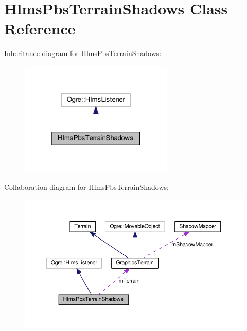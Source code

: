 \hypertarget{class_hlms_pbs_terrain_shadows}{}\section{Hlms\+Pbs\+Terrain\+Shadows Class Reference}
\label{class_hlms_pbs_terrain_shadows}


Inheritance diagram for Hlms\+Pbs\+Terrain\+Shadows\+:\nopagebreak
\begin{figure}[H]
\begin{center}
\leavevmode
\includegraphics[width=208pt]{class_hlms_pbs_terrain_shadows__inherit__graph}
\end{center}
\end{figure}


Collaboration diagram for Hlms\+Pbs\+Terrain\+Shadows\+:\nopagebreak
\begin{figure}[H]
\begin{center}
\leavevmode
\includegraphics[width=350pt]{class_hlms_pbs_terrain_shadows__coll__graph}
\end{center}
\end{figure}
